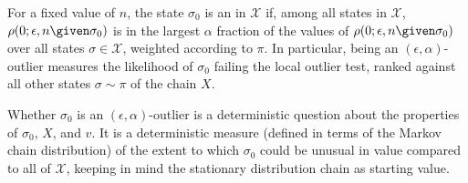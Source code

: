 \documentclass[12pt]{article}
\begin{document}
\begin{definition}
    For a fixed value of \( n \), the state \( \sigma_0 \) is an  in \( \mathcal{X} \) if, among all
    states in \( \mathcal{X} \), \( \rho(0; \epsilon, n \given \sigma_{0})
    \) is in the largest \( \alpha \) fraction of the values of \( \rho(0;
    \epsilon, n \given \sigma_{0}) \) over all states \( \sigma \in
    \mathcal{X} \), weighted according to \( \pi \).  In particular,
    being an \( (\epsilon, \alpha) \)-outlier measures the likelihood of
    \( \sigma_0 \) failing the local outlier test, ranked against all
    other states \( \sigma \sim \pi \) of the chain \( X \).
\end{definition}

Whether \( \sigma_0 \) is an \( (\epsilon, \alpha) \)-outlier is a
deterministic question about the properties of \( \sigma_0 \), \( X \),
and \( v \).  It is a deterministic measure (defined in terms of the
Markov chain distribution) of the extent to which \( \sigma_0 \) could
be unusual in value compared to all of \( \mathcal{X} \), keeping in
mind the stationary distribution chain as starting value.
\end{document}
